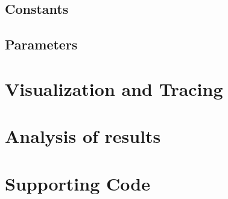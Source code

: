 \documentclass[10pt]{extarticle}
\begin{document}
\subsection{Constants}

\subsection{Parameters}
\section{Visualization and Tracing}
\section{Analysis of results}

\section{Supporting Code}

\end{document}
